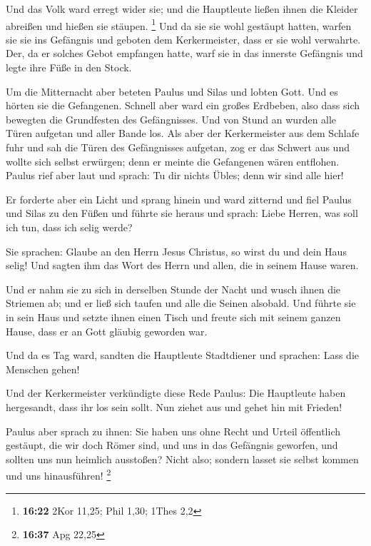  Und das Volk ward erregt wider sie; und die Hauptleute
ließen ihnen die Kleider abreißen und hießen sie stäupen. \footnote{\textbf{16:22}
  2Kor 11,25; Phil 1,30; 1Thes 2,2}  Und da sie sie wohl
gestäupt hatten, warfen sie sie ins Gefängnis und geboten dem
Kerkermeister, dass er sie wohl verwahrte.  Der, da er
solches Gebot empfangen hatte, warf sie in das innerste Gefängnis und
legte ihre Füße in den Stock.

 Um die Mitternacht aber beteten Paulus und Silas und
lobten Gott. Und es hörten sie die Gefangenen.  Schnell
aber ward ein großes Erdbeben, also dass sich bewegten die Grundfesten
des Gefängnisses. Und von Stund an wurden alle Türen aufgetan und aller
Bande los.  Als aber der Kerkermeister aus dem Schlafe fuhr
und sah die Türen des Gefängnisses aufgetan, zog er das Schwert aus und
wollte sich selbst erwürgen; denn er meinte die Gefangenen wären
entflohen.  Paulus rief aber laut und sprach: Tu dir nichts
Übles; denn wir sind alle hier!

 Er forderte aber ein Licht und sprang hinein und ward
zitternd und fiel Paulus und Silas zu den Füßen  und führte
sie heraus und sprach: Liebe Herren, was soll ich tun, dass ich selig
werde?

 Sie sprachen: Glaube an den Herrn Jesus Christus, so wirst
du und dein Haus selig!  Und sagten ihm das Wort des Herrn
und allen, die in seinem Hause waren.

 Und er nahm sie zu sich in derselben Stunde der Nacht und
wusch ihnen die Striemen ab; und er ließ sich taufen und alle die Seinen
alsobald.  Und führte sie in sein Haus und setzte ihnen
einen Tisch und freute sich mit seinem ganzen Hause, dass er an Gott
gläubig geworden war.

 Und da es Tag ward, sandten die Hauptleute Stadtdiener und
sprachen: Lass die Menschen gehen!

 Und der Kerkermeister verkündigte diese Rede Paulus: Die
Hauptleute haben hergesandt, dass ihr los sein sollt. Nun ziehet aus und
gehet hin mit Frieden!

 Paulus aber sprach zu ihnen: Sie haben uns ohne Recht und
Urteil öffentlich gestäupt, die wir doch Römer sind, und uns in das
Gefängnis geworfen, und sollten uns nun heimlich ausstoßen? Nicht also;
sondern lasset sie selbst kommen und uns hinausführen! \footnote{\textbf{16:37}
  Apg 22,25}

